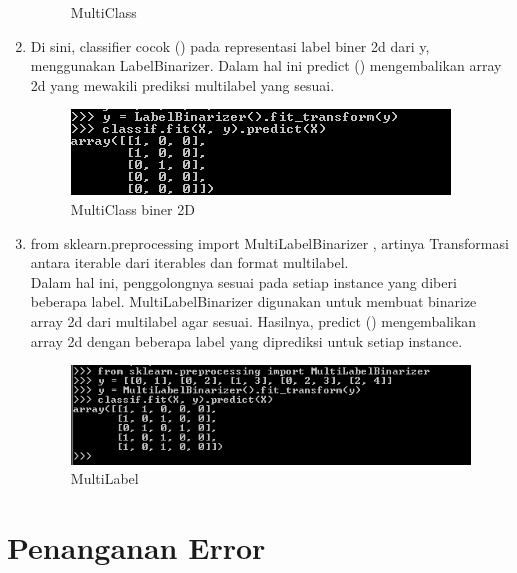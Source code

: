\begin{enumerate}
\begin{figure}
\begin{center}
   	 \caption{MultiClass }
	\end{center}
\end{figure}
\item
Di sini, classifier cocok () pada representasi label biner 2d dari y, menggunakan LabelBinarizer. Dalam hal ini predict () mengembalikan array 2d yang mewakili prediksi multilabel yang sesuai.
\begin{figure}
	\begin{center}
   	 \includegraphics[scale=1]{figures/andri18.png}
   	 \caption{MultiClass  biner 2D}
	\end{center}
\end{figure}
\item
from sklearn.preprocessing import MultiLabelBinarizer , artinya Transformasi antara iterable dari iterables dan format multilabel.\\
Dalam hal ini, penggolongnya sesuai pada setiap instance yang diberi beberapa label. MultiLabelBinarizer digunakan untuk membuat binarize array 2d dari multilabel agar sesuai. Hasilnya, predict () mengembalikan array 2d dengan beberapa label yang diprediksi untuk setiap instance.
\begin{figure}
	\begin{center}
   	 \includegraphics[scale=1]{figures/andri19.png}
   	 \caption{MultiLabel }
	\end{center}
\end{figure}
\end{enumerate}

\section{Penanganan Error}

